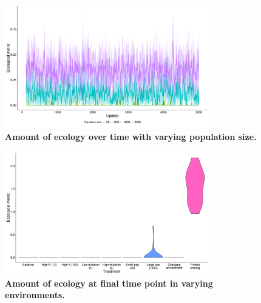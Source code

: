\documentclass[letterpaper]{article}
\begin{document}
\begin{figure}
\includegraphics[width=3.5in]{figs/ecological_mean_ci_pop_size.png}
\caption{\textbf{Amount of ecology over time with varying population size.}}
\label{ecological_time}
\end{figure}
\begin{figure}
\includegraphics[width=3.5in]{figs/ecologyboxplots.png}
\caption{\textbf{Amount of ecology at final time point in varying environments.} }
\label{ecology}
\end{figure}
\end{document}
